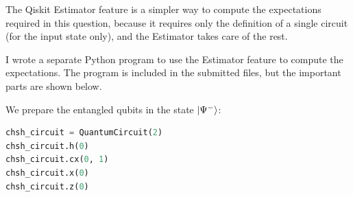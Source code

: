 \documentclass[12pt]{extarticle}
\begin{document}
\begin{enumerate}[(a)]



The Qiskit Estimator feature is a simpler way to compute the expectations required in this question,
because it requires only the definition of a single circuit (for the input state only),
and the Estimator takes care of the rest.

I wrote a separate Python program to use the Estimator feature to compute the expectations.
The program is included in the submitted files, but the important parts are shown below.

We prepare the entangled qubits in the state $\ket{\Psi^{-}}$:
\begin{lstlisting}[language=python]
chsh_circuit = QuantumCircuit(2)
chsh_circuit.h(0)
chsh_circuit.cx(0, 1)
chsh_circuit.x(0)
chsh_circuit.z(0)
\end{lstlisting}


\end{enumerate}
\end{document}
